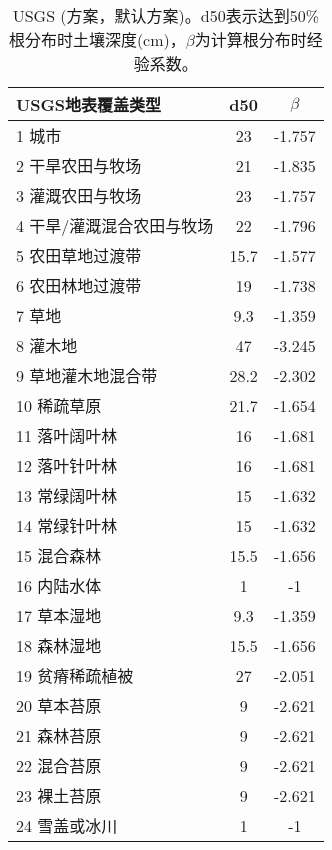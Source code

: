\begin{table}[]
    \centering
    \caption{USGS (\citet{schenk2002rooting}方案，默认方案)。d50表示达到50\%根分布时土壤深度(cm)，$\beta$为计算根分布时经验系数。}
    \label{tab:USGSSchenkANDJackson2002方案默认方案}
    \begin{tabular}{@{}lcc@{}}
    \toprule
    USGS地表覆盖类型     & d50  & $\beta$ \\ \midrule
    1 城市           & 23   & -1.757  \\
    2 干旱农田与牧场      & 21   & -1.835  \\
    3 灌溉农田与牧场      & 23   & -1.757  \\
    4 干旱/灌溉混合农田与牧场 & 22   & -1.796  \\
    5 农田草地过渡带      & 15.7 & -1.577  \\
    6 农田林地过渡带      & 19   & -1.738  \\
    7 草地           & 9.3  & -1.359  \\
    8 灌木地          & 47   & -3.245  \\
    9 草地灌木地混合带     & 28.2 & -2.302  \\
    10 稀疏草原        & 21.7 & -1.654  \\
    11 落叶阔叶林       & 16   & -1.681  \\
    12 落叶针叶林       & 16   & -1.681  \\
    13 常绿阔叶林       & 15   & -1.632  \\
    14 常绿针叶林       & 15   & -1.632  \\
    15 混合森林        & 15.5 & -1.656  \\
    16 内陆水体        & 1    & -1      \\
    17 草本湿地        & 9.3  & -1.359  \\
    18 森林湿地        & 15.5 & -1.656  \\
    19 贫瘠稀疏植被      & 27   & -2.051  \\
    20 草本苔原        & 9    & -2.621  \\
    21 森林苔原        & 9    & -2.621  \\
    22 混合苔原        & 9    & -2.621  \\
    23 裸土苔原        & 9    & -2.621  \\
    24 雪盖或冰川       & 1    & -1      \\ \bottomrule
\end{tabular}
\end{table}


